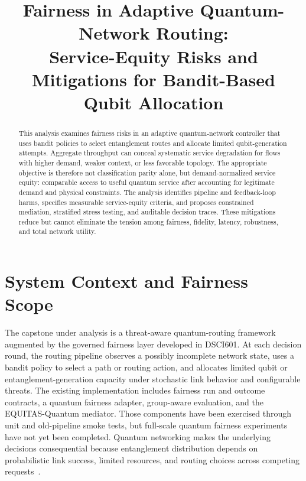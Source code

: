 \documentclass[10pt,conference]{IEEEtran}
\title{Fairness in Adaptive Quantum-Network Routing:\\
Service-Equity Risks and Mitigations for Bandit-Based Qubit Allocation}
\author{\IEEEauthorblockN{Piter Z. Garcia Bautista}
\IEEEauthorblockA{DSCI 602: Applied Data Science II\\
Capstone: Fairness-Aware Adaptive Routing for Quantum Networks\\
Chosen Focus Area: Fairness}}
\begin{document}
\maketitle

\begin{abstract}
This analysis examines fairness risks in an adaptive quantum-network controller that uses bandit policies to select entanglement routes and allocate limited qubit-generation attempts. Aggregate throughput can conceal systematic service degradation for flows with higher demand, weaker context, or less favorable topology. The appropriate objective is therefore not classification parity alone, but demand-normalized service equity: comparable access to useful quantum service after accounting for legitimate demand and physical constraints. The analysis identifies pipeline and feedback-loop harms, specifies measurable service-equity criteria, and proposes constrained mediation, stratified stress testing, and auditable decision traces. These mitigations reduce but cannot eliminate the tension among fairness, fidelity, latency, robustness, and total network utility.
\end{abstract}

\section{System Context and Fairness Scope}

The capstone under analysis is a threat-aware quantum-routing framework augmented by the governed fairness layer developed in DSCI601. At each decision round, the routing pipeline observes a possibly incomplete network state, uses a bandit policy to select a path or routing action, and allocates limited qubit or entanglement-generation capacity under stochastic link behavior and configurable threats. The existing implementation includes fairness run and outcome contracts, a quantum fairness adapter, group-aware evaluation, and the EQUITAS-Quantum mediator. Those components have been exercised through unit and old-pipeline smoke tests, but full-scale quantum fairness experiments have not yet been completed. Quantum networking makes the underlying decisions consequential because entanglement distribution depends on probabilistic link success, limited resources, and routing choices across competing requests~\cite{wehner2018quantum,pant2019routing}.
\end{document}
